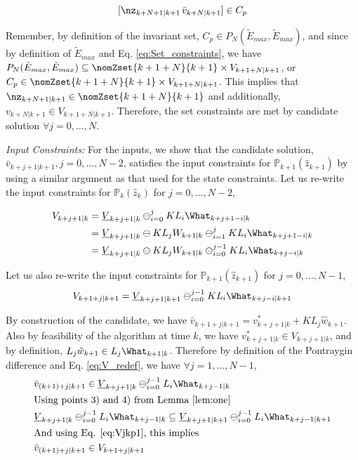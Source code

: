 \begin{equation}
\label{eq:CandidateInC}
[\nz_{k+N+1|k+1}\, \bar{v}_{k+N|k+1}] \in C_p
\end{equation}

Remember, by definition of the invariant set, $C_p \in P_N(\tilde{E}_{max},\tilde{E}_{max})$, and since by definition of $\tilde{E}_{max}$ and Eq. \ref{eq:Set_constraints}, we have $P_N(\tilde{E}_{max},\tilde{E}_{max}) \subseteq \nomZset{k+1+N}{k+1} \times V_{k+1+N|k+1}$, or $C_p \in  \nomZset{k+1+N}{k+1} \times {V}_{k+1+N|k+1}$. This implies that $\nz_{k+N+1|k+1} \in \nomZset{k+1+N}{k+1}$ and additionally, $v_{k+N|k+1} \in {V}_{k+1+N|k+1}$.
Therefore, the set constraints are met by candidate solution $\forall j=0,\dotsc,N$. 

\textit{Input Constraints:} For the inputs, we show that the candidate solution, $\bar{v}_{k+j+1|k+1}, j=0,\ldots,N-2$, satisfies the input constraints for $\mathbb{P}_{k+1}(\hat{z}_{k+1}) $ by using a similar argument as that used for the state constraints. 
Let us re-write the input constraints for $\mathbb{P}_{k}(\hat{z}_{k})$ for $j=0,\dotsc,N-2$,

\begin{subequations}
\label{eq:V_redef}
\begin{align}
V_{k+j+1|k}&=\underline{V}_{k+j+1|k} \ominus_{i=0}^{j} KL_i\What_{k+j+1-i|k} \\
&=\underline{V}_{k+j+1|k} \ominus KL_jW_{k+1|k} \ominus_{i=1}^{j} KL_i\What_{k+j+1-i|k} \\
&=\underline{V}_{k+j+1|k} \ominus KL_jW_{k+1|k} \ominus_{i=0}^{j-1} KL_i\What_{k+j-i|k}
\end{align}
\end{subequations}

Let us also re-write the input constraints for $\mathbb{P}_{k+1}(\hat{z}_{k+1})$ for $j=0,\dotsc,N-1$,
\begin{equation}
\label{eq:Vjkp1}
V_{k+1+j|k+1}=\underline{V}_{k+j+1|k+1} \ominus_{i=0}^{j-1} KL_i\What_{k+j-i|k+1}
\end{equation}

By construction of the candidate, we have $\bar{v}_{k+1+j|k+1}=v^{*}_{k+j+1|k}+KL_j\hat{w}_{k+1}$. Also by feasibility of the algorithm at time $k$, we have $v^{*}_{k+j+1|k} \in V_{k+j+1|k}$, and by definition, $L_j\hat{w}_{k+1} \in L_j\What_{k+1|k}$. Therefore by definition of the Pontraygin difference and Eq. \ref{eq:V_redef}, we have $\forall j=1,\dotsc,N-1$,
\begin{subequations}
\begin{align}
&\bar{v}_{(k+1)+j|k+1} \in \underline{V}_{k+j+1|k} \ominus_{i=0}^{j-1}L_i\What_{k+j-1|k} \\
&\text{Using points 3) and 4) from Lemma \ref{lem:one}} \nonumber \\
&\underline{V}_{k+j+1|k} \ominus_{i=0}^{j-1}L_i\What_{k+j-1|k} \subseteq \underline{V}_{k+j+1|k+1} \ominus_{i=0}^{j-1}L_i\What_{k+j-1|k+1} \\
&\text{And using Eq. \ref{eq:Vjkp1}, this implies} \nonumber \\
&\bar{v}_{(k+1)+j|k+1} \in V_{k+1+j|k+1}
\end{align}
\end{subequations}

